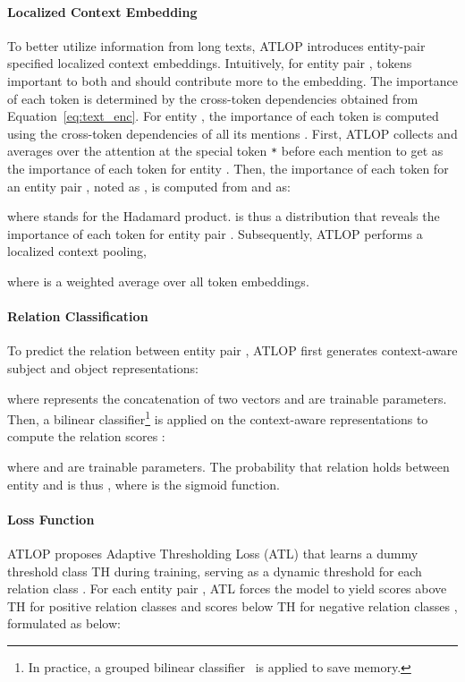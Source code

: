 \documentclass[11pt]{article}
\begin{document}
\paragraph{Localized Context Embedding} To better utilize information from long texts, ATLOP introduces entity-pair specified localized context embeddings. 
Intuitively, for entity pair , tokens important to both  and  should contribute more to the embedding.
The importance of each token is determined by the cross-token dependencies  obtained from Equation~\ref{eq:text_enc}.
For entity , the importance of each token is computed using the cross-token dependencies of all its mentions . 
First, ATLOP collects and averages over the attention  at the special token \texttt{*} before each mention  to get  as the importance of each token for entity .
Then, the importance of each token for an entity pair , noted as , is computed from  and  as: 

where  stands for the Hadamard product.
 is thus a distribution that reveals the importance of each token for entity pair .
Subsequently, ATLOP performs a localized context pooling,
   
where  is a weighted average over all token embeddings. 
\paragraph{Relation Classification} To predict the relation between entity pair , ATLOP first generates context-aware subject and object representations:

where  represents the concatenation of two vectors and  are trainable parameters. 
Then, a bilinear classifier\footnote{In practice, a grouped bilinear classifier~\cite{Zheng2019LearningDB} is applied to save memory.} is applied on the context-aware representations to compute the relation scores :

where  and  are trainable parameters.
The probability that relation  holds between entity  and  is thus , where  is the sigmoid function.

\paragraph{Loss Function} ATLOP proposes Adaptive Thresholding Loss (ATL) that learns a dummy threshold class TH during training, serving as a dynamic threshold for each relation class .
For each entity pair , ATL forces the model to yield scores above TH for positive relation classes  and scores below TH for negative relation classes , formulated as below:
\end{document}
